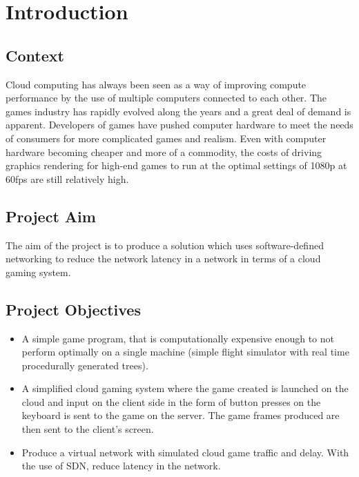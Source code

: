 \chapter{Introduction}
\label{chapter1}

\section{Context}
Cloud computing has always been seen as a way of improving compute performance by the use of multiple computers connected to each other. The games industry has rapidly evolved along the years and a great deal of demand is apparent. Developers of games have pushed computer hardware to meet the needs of consumers for more complicated games and realism. Even with computer hardware becoming cheaper and more of a commodity, the costs of driving graphics rendering for high-end games to run at the optimal settings of 1080p at 60fps are still relatively high.

\section{Project Aim}
The aim of the project is to produce a solution which uses software-defined networking to reduce the network latency in a network in terms of a cloud gaming system.

\section{Project Objectives}
\begin{itemize}
  \item A simple game program, that is computationally expensive enough to not perform optimally on a single machine (simple flight simulator with real time procedurally generated trees).
  \item A simplified cloud gaming system where the game created is launched on the cloud and input on the client side in the form of button presses on the keyboard is sent to the game on the server. The game frames produced are then sent to the client's screen.
  \item Produce a virtual network with simulated cloud game traffic and delay. With the use of SDN, reduce latency in the network.
\end{itemize}

